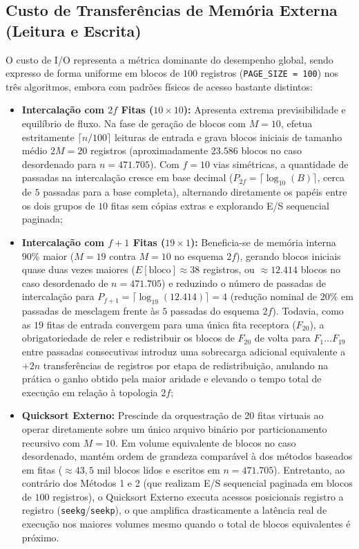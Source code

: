 \documentclass[12pt,a4paper]{article}
\begin{document}
\subsection{Custo de Transferências de Memória Externa (Leitura e Escrita)}
O custo de I/O representa a métrica dominante do desempenho global, sendo expresso de forma uniforme em blocos de $100$ registros (\texttt{PAGE\_SIZE = 100}) nos três algoritmos, embora com padrões físicos de acesso bastante distintos:
\begin{itemize}
    \item \textbf{Intercalação com $2f$ Fitas ($10 \times 10$):} Apresenta extrema previsibilidade e equilíbrio de fluxo. Na fase de geração de blocos com $M = 10$, efetua estritamente $\lceil n / 100 \rceil$ leituras de entrada e grava blocos iniciais de tamanho médio $2M = 20$ registros (aproximadamente $23.586$ blocos no caso desordenado para $n = 471.705$). Com $f = 10$ vias simétricas, a quantidade de passadas na intercalação cresce em base decimal ($P_{2f} = \lceil \log_{10}(B) \rceil$, cerca de $5$ passadas para a base completa), alternando diretamente os papéis entre os dois grupos de $10$ fitas sem cópias extras e explorando E/S sequencial paginada;
    \item \textbf{Intercalação com $f+1$ Fitas ($19 \times 1$):} Beneficia-se de memória interna $90\%$ maior ($M = 19$ contra $M = 10$ no esquema $2f$), gerando blocos iniciais quase duas vezes maiores ($E[\text{bloco}] \approx 38$ registros, ou $\approx 12.414$ blocos no caso desordenado de $n = 471.705$) e reduzindo o número de passadas de intercalação para $P_{f+1} = \lceil \log_{19}(12.414) \rceil = 4$ (redução nominal de $20\%$ em passadas de mesclagem frente às $5$ passadas do esquema $2f$). Todavia, como as $19$ fitas de entrada convergem para uma única fita receptora ($F_{20}$), a obrigatoriedade de reler e redistribuir os blocos de $F_{20}$ de volta para $F_1 \dots F_{19}$ entre passadas consecutivas introduz uma sobrecarga adicional equivalente a $+2n$ transferências de registros por etapa de redistribuição, anulando na prática o ganho obtido pela maior aridade e elevando o tempo total de execução em relação à topologia $2f$;
    \item \textbf{Quicksort Externo:} Prescinde da orquestração de 20 fitas virtuais ao operar diretamente sobre um único arquivo binário por particionamento recursivo com $M = 10$. Em volume equivalente de blocos no caso desordenado, mantém ordem de grandeza comparável à dos métodos baseados em fitas ($\approx 43{,}5\text{ mil}$ blocos lidos e escritos em $n = 471.705$). Entretanto, ao contrário dos Métodos 1 e 2 (que realizam E/S sequencial paginada em blocos de $100$ registros), o Quicksort Externo executa acessos posicionais registro a registro (\texttt{seekg}/\texttt{seekp}), o que amplifica drasticamente a latência real de execução nos maiores volumes mesmo quando o total de blocos equivalentes é próximo.
\end{itemize}
\end{document}
